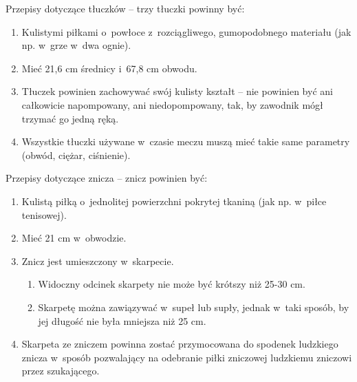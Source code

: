 \documentclass[12pt,a4paper]{article}
\renewcommand{\subsubsection}[1]{
  \oldsubsubsection{#1}%
  \leftskip1.3cm
}
\begin{document}
\subsubsection{Tłuczki}
Przepisy dotyczące tłuczków -- trzy tłuczki powinny być:

\begin{enumerate}
	\item Kulistymi piłkami o~powłoce z~rozciągliwego, gumopodobnego materiału
	      (jak np. w~grze w~dwa ognie).

	\item Mieć 21,6 cm średnicy i~67,8 cm obwodu.

	\item Tłuczek powinien zachowywać swój kulisty kształt -- nie powinien być
	      ani całkowicie napompowany, ani niedopompowany, tak, by zawodnik mógł
	      trzymać go jedną ręką.

	\item Wszystkie tłuczki używane w~czasie meczu muszą mieć takie same
	      parametry (obwód, ciężar, ciśnienie).
\end{enumerate}

\subsubsection{Znicz}
Przepisy dotyczące znicza -- znicz powinien być:

\begin{enumerate}
	\item Kulistą piłką o~jednolitej powierzchni pokrytej tkaniną (jak np. w~piłce tenisowej).

	\item Mieć 21 cm w~obwodzie.

	\item Znicz jest umieszczony w~skarpecie.
	      \begin{enumerate}
		      \item Widoczny odcinek skarpety nie może być krótszy niż 25-30 cm.

		      \item Skarpetę można zawiązywać w~supeł lub supły, jednak w~taki sposób,
		            by jej długość nie była mniejsza niż 25 cm.
	      \end{enumerate}
	\item Skarpeta ze zniczem powinna zostać przymocowana do spodenek ludzkiego
	      znicza w~sposób pozwalający na odebranie piłki zniczowej ludzkiemu
	      zniczowi przez szukającego.
\end{enumerate}
\end{document}
